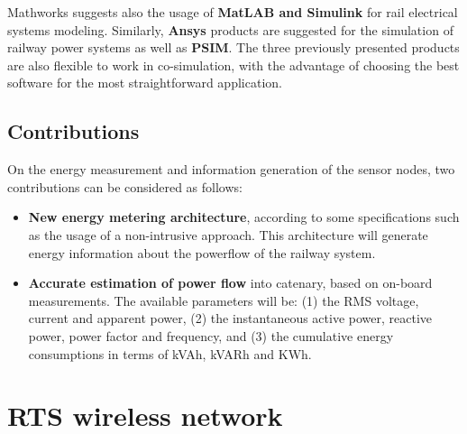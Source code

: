 Mathworks suggests also the usage of \textbf{MatLAB and Simulink} for rail electrical systems modeling. 
Similarly, \textbf{Ansys} products are suggested for the simulation of railway power systems as well as \textbf{PSIM}. The three previously presented products are also flexible to work in co-simulation, with the advantage of choosing the best software for the most straightforward application.


	\subsection{Contributions}
	
	On the energy measurement and information generation of the sensor nodes, two contributions can be considered as follows:
	
	\begin{itemize}
		\setlength\itemsep{0em}
		
		\item \textbf{New energy metering architecture}, according to some specifications such as the usage of a non-intrusive approach.
		This architecture will generate energy information about the powerflow of the railway system.
		
		\item \textbf{Accurate estimation of power flow} into catenary, based on on-board measurements. The available parameters will be: (1) the RMS voltage, current and apparent power, (2) the instantaneous active power, reactive power, power factor and frequency, and (3) the cumulative energy consumptions in terms of kVAh, kVARh and KWh.
		
		
	\end{itemize}

%		
%		
	

\section{RTS wireless network}
\label{sec:43}

